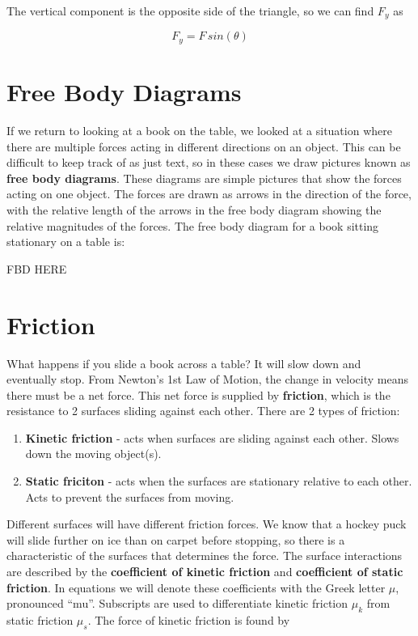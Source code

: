 \documentclass[12pt]{book}
\begin{document}
The vertical component is the opposite side of the triangle, so we can find $F_y$ as

\begin{equation}
F_y = F \, sin(\theta)
\end{equation}

\section{Free Body Diagrams}

If we return to looking at a book on the table, we looked at a situation where there are multiple forces acting in different directions on an object. This can be difficult to keep track of as just text, so in these cases we draw pictures known as \textbf{free body diagrams}. These diagrams are simple pictures that show the forces acting on one object. The forces are drawn as arrows in the direction of the force, with the relative length of the arrows in the free body diagram showing the relative magnitudes of the forces. The free body diagram for a book sitting stationary on a table is:

FBD HERE

\section{Friction}

What happens if you slide a book across a table? It will slow down and eventually stop. From Newton's 1st Law of Motion, the change in velocity means there must be a net force. This net force is supplied by \textbf{friction}, which is the resistance to 2 surfaces sliding against each other. There are 2 types of friction:

\begin{enumerate}
\item \textbf{Kinetic friction} - acts when surfaces are sliding against each other. Slows down the moving object(s).

\item \textbf{Static friciton} - acts when the surfaces are stationary relative to each other. Acts to prevent the surfaces from moving.
\end{enumerate}

Different surfaces will have different friction forces. We know that a hockey puck will slide further on ice than on carpet before stopping, so there is a characteristic of the surfaces that determines the force. The surface interactions are described by the \textbf{coefficient of kinetic friction} and \textbf{coefficient of static friction}. In equations we will denote these coefficients with the Greek letter $\mu$, pronounced ``mu''. Subscripts are used to differentiate kinetic friction $\mu_k$ from static friction $\mu_s$. The force of kinetic friction is found by
\end{document}
